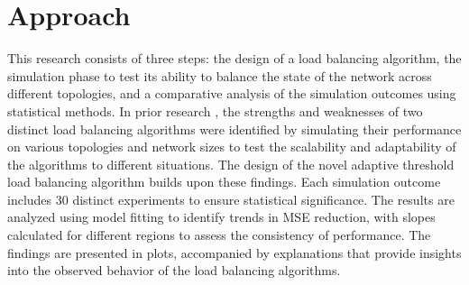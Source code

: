 \section{Approach}\label{sec:approach}
This research consists of three steps: the design of a load balancing algorithm, the simulation phase to test its ability to balance the state of the network across different topologies, and a comparative analysis of the simulation outcomes using statistical methods. In prior research \cite{Bayazitoglu}, the strengths and weaknesses of two distinct load balancing algorithms were identified by simulating their performance on various topologies and network sizes to test the scalability and adaptability of the algorithms to different situations. The design of the novel adaptive threshold load balancing algorithm builds upon these findings. Each simulation outcome includes 30 distinct experiments to ensure statistical significance. The results are analyzed using model fitting to identify trends in MSE reduction, with slopes calculated for different regions to assess the consistency of performance. The findings are presented in plots, accompanied by explanations that provide insights into the observed behavior of the load balancing algorithms.
